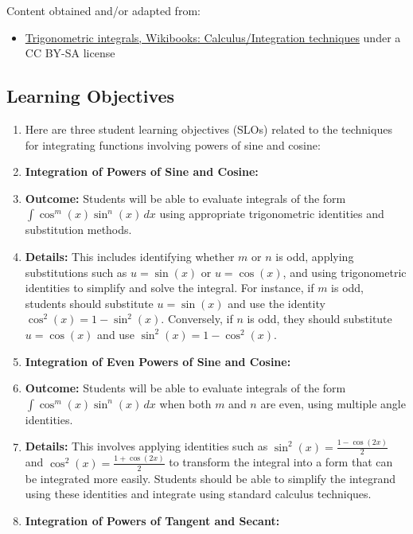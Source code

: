 Content obtained and/or adapted from:



\begin{itemize}
    \item \href{https://en.wikibooks.org/wiki/Calculus/Integration_techniques/Trigonometric_Integrals}{Trigonometric integrals, Wikibooks: Calculus/Integration techniques} under a CC BY-SA license
\end{itemize}

\subsection{Learning Objectives}

\begin{enumerate}
    \item Here are three student learning objectives (SLOs) related to the techniques for integrating functions involving powers of sine and cosine:
    \item \textbf{Integration of Powers of Sine and Cosine:}
    \item \textbf{Outcome:} Students will be able to evaluate integrals of the form $\int \cos^m(x) \sin^n(x) \, dx$ using appropriate trigonometric identities and substitution methods.
    \item \textbf{Details:} This includes identifying whether $m$ or $n$ is odd, applying substitutions such as $u = \sin(x)$ or $u = \cos(x)$, and using trigonometric identities to simplify and solve the integral. For instance, if $m$ is odd, students should substitute $u = \sin(x)$ and use the identity $\cos^2(x) = 1 - \sin^2(x)$. Conversely, if $n$ is odd, they should substitute $u = \cos(x)$ and use $\sin^2(x) = 1 - \cos^2(x)$.
    \item \textbf{Integration of Even Powers of Sine and Cosine:}
    \item \textbf{Outcome:} Students will be able to evaluate integrals of the form $\int \cos^m(x) \sin^n(x) \, dx$ when both $m$ and $n$ are even, using multiple angle identities.
    \item \textbf{Details:} This involves applying identities such as $\sin^2(x) = \frac{1 - \cos(2x)}{2}$ and $\cos^2(x) = \frac{1 + \cos(2x)}{2}$ to transform the integral into a form that can be integrated more easily. Students should be able to simplify the integrand using these identities and integrate using standard calculus techniques.
    \item \textbf{Integration of Powers of Tangent and Secant:}

\end{enumerate}
